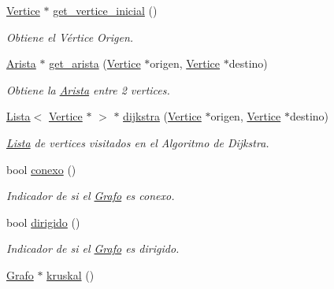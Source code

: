 \begin{DoxyCompactItemize}
\mbox{\label{classGrafo_a4baa752c1e6a7e6367672581525c3c19}} 
\hyperlink{classVertice}{Vertice} $\ast$ \hyperlink{classGrafo_a4baa752c1e6a7e6367672581525c3c19}{get\+\_\+vertice\+\_\+inicial} ()
\begin{DoxyCompactList}\small\item\em Obtiene el Vértice Origen. \end{DoxyCompactList}\item 
\hyperlink{classArista}{Arista} $\ast$ \hyperlink{classGrafo_aed632e897451b00634e8f1d8088c12c8}{get\+\_\+arista} (\hyperlink{classVertice}{Vertice} $\ast$origen, \hyperlink{classVertice}{Vertice} $\ast$destino)
\begin{DoxyCompactList}\small\item\em Obtiene la \hyperlink{classArista}{Arista} entre 2 vertices. \end{DoxyCompactList}\item 
\hyperlink{classLista}{Lista}$<$ \hyperlink{classVertice}{Vertice} $\ast$ $>$ $\ast$ \hyperlink{classGrafo_a4bb5d2fe50503dd9f6c8042cee3e3631}{dijkstra} (\hyperlink{classVertice}{Vertice} $\ast$origen, \hyperlink{classVertice}{Vertice} $\ast$destino)
\begin{DoxyCompactList}\small\item\em \hyperlink{classLista}{Lista} de vertices visitados en el \textquotesingle{}Algoritmo de Dijkstra\textquotesingle{}. \end{DoxyCompactList}\item 
\mbox{\label{classGrafo_a50fe04d01b2d34b777d8df0b827bedab}} 
bool \hyperlink{classGrafo_a50fe04d01b2d34b777d8df0b827bedab}{conexo} ()
\begin{DoxyCompactList}\small\item\em Indicador de si el \hyperlink{classGrafo}{Grafo} es conexo. \end{DoxyCompactList}\item 
\mbox{\label{classGrafo_a40fa3c86b1e2890d4dad315bbd59d2d0}} 
bool \hyperlink{classGrafo_a40fa3c86b1e2890d4dad315bbd59d2d0}{dirigido} ()
\begin{DoxyCompactList}\small\item\em Indicador de si el \hyperlink{classGrafo}{Grafo} es dirigido. \end{DoxyCompactList}\item 
\hyperlink{classGrafo}{Grafo} $\ast$ \hyperlink{classGrafo_aa2ab9a12d473f6830af554efad5b438d}{kruskal} ()

\end{DoxyCompactItemize}
